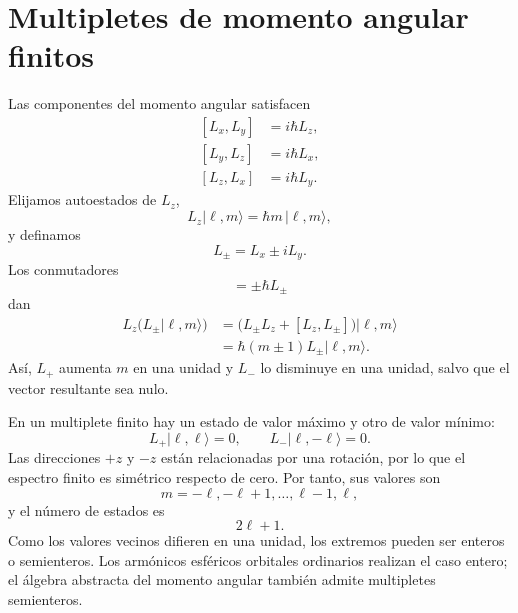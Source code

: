 \section{Multipletes de momento angular finitos}

Las componentes del momento angular satisfacen
\begin{equation}
\begin{aligned}
[L_x,L_y]&=i\hbar L_z,\\
[L_y,L_z]&=i\hbar L_x,\\
[L_z,L_x]&=i\hbar L_y.
\end{aligned}
\end{equation}
Elijamos autoestados de \(L_z\),
\begin{equation}
L_z|\ell,m\rangle=\hbar m\,|\ell,m\rangle,
\end{equation}
y definamos
\begin{equation}
L_\pm=L_x\pm iL_y.
\end{equation}
Los conmutadores
\begin{equation}
[L_z,L_\pm]=\pm\hbar L_\pm
\end{equation}
dan
\begin{align}
L_z\bigl(L_\pm|\ell,m\rangle\bigr)
&=\bigl(L_\pm L_z+[L_z,L_\pm]\bigr)|\ell,m\rangle \\
&=\hbar(m\pm1)L_\pm|\ell,m\rangle.
\end{align}
Así, \(L_+\) aumenta \(m\) en una unidad y \(L_-\) lo disminuye en una unidad, salvo que el vector resultante sea nulo.

En un multiplete finito hay un estado de valor máximo y otro de valor mínimo:
\begin{equation}
L_+|\ell,\ell\rangle=0,
\qquad
L_-|\ell,-\ell\rangle=0.
\end{equation}
Las direcciones \(+z\) y \(-z\) están relacionadas por una rotación, por lo que el espectro finito es simétrico respecto de cero. Por tanto, sus valores son
\begin{equation}
m=-\ell,-\ell+1,\ldots,\ell-1,\ell,
\end{equation}
y el número de estados es
\begin{equation}
2\ell+1.
\end{equation}
Como los valores vecinos difieren en una unidad, los extremos pueden ser enteros o semienteros. Los armónicos esféricos orbitales ordinarios realizan el caso entero; el álgebra abstracta del momento angular también admite multipletes semienteros.

\begin{classroomqa}
\end{classroomqa}

